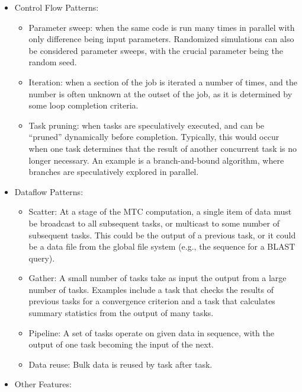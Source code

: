 \documentclass[10pt,letterpaper]{article}
\begin{document}
\begin{itemize}

\item Control Flow Patterns:

  \begin{itemize}
  \item Parameter sweep:  when the same code is
    run many times in parallel with only difference being input parameters.
    Randomized simulations can also be considered parameter sweeps,
    with the crucial parameter being the random seed.
  \item Iteration: when a section of the job is
    iterated a number of times, and the number is often unknown at the outset of the job, as it is
    determined by some loop completion criteria.
  \item Task pruning: when tasks are speculatively
    executed, and can be ``pruned'' dynamically before completion.
    Typically, this would occur when one task determines
    that the result of another concurrent task is no longer necessary.
    An example
    is a branch-and-bound algorithm, where branches are
    speculatively explored in parallel.
  \end{itemize}

\item Dataflow Patterns:

  \begin{itemize}
  \item Scatter: At a stage of the MTC computation, a single
    item of data must be broadcast to all subsequent tasks, or multicast
    to some number of subsequent tasks.  This
    could be the output of a previous task, or it could be a
    data file from the global file system (e.g., the sequence
    for a BLAST query). 
  \item Gather: A small number of tasks take as input the
    output from a large number of tasks.  Examples include a task
    that checks the results of previous tasks for a convergence
    criterion and a task that calculates summary statistics from the
    output of many tasks.
    \item Pipeline: A set of tasks operate on given data in
    sequence, with the output of one task becoming the input of the
    next.
  \item Data reuse: Bulk data is reused by task after task.
  \end{itemize}

\item Other Features:


\end{itemize}
\end{document}
